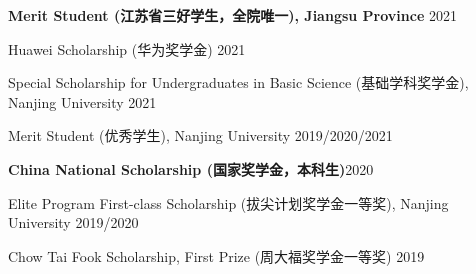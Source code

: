\begin{enumerate}[label={[\arabic*]}]
\item \textbf{Merit Student (江苏省三好学生，全院唯一), Jiangsu Province} \hfill 2021
\item Huawei Scholarship (华为奖学金) \hfill 2021
\item Special Scholarship for Undergraduates in Basic Science (基础学科奖学金), Nanjing University \hfill 2021
\item Merit Student (优秀学生), Nanjing University \hfill 2019/2020/2021
\item \textbf{China National Scholarship (国家奖学金，本科生)}\hfill 2020
\item Elite Program First-class Scholarship (拔尖计划奖学金一等奖), Nanjing University \hfill 2019/2020
\item Chow Tai Fook Scholarship, First Prize (周大福奖学金一等奖) \hfill 2019
\end{enumerate}
